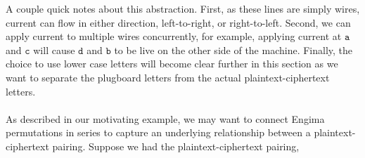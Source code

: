 \begin{center}
\end{center}
A couple quick notes about this abstraction. First, as these lines are
simply wires, current can flow in either direction, left-to-right, or
right-to-left.
Second, we can apply current to multiple wires concurrently, for
example, applying current at $\texttt{a}$ and $\texttt{c}$ will cause
$\texttt{d}$ and $\texttt{b}$ to be
live on the other side of the machine.
Finally, the choice to use lower case letters will become clear
further in this section as we want to separate the plugboard letters
from the actual plaintext-ciphertext letters.
\\\\As described in our motivating example, we may want to connect
Engima permutations in series to capture an underlying relationship
between a plaintext-ciphertext pairing.
Suppose we had the plaintext-ciphertext pairing,
